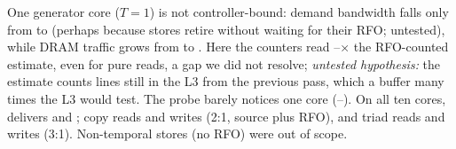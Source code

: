 One generator core ($T=1$) is not controller-bound: demand bandwidth falls only from
 to  (perhaps because
stores retire without waiting for their RFO; untested), while DRAM traffic grows from
 to . Here the counters
read --$\times$ the RFO-counted estimate, even for pure reads, a
gap we did not resolve; \emph{untested hypothesis:} the estimate counts lines still in the L3 from the
previous pass, which a buffer many times the L3 would test. The probe barely notices one core
(--). On all ten cores,  delivers
 and  ; copy reads
 and writes 
(2:1, source plus RFO), and triad reads  and writes
 (3:1). Non-temporal stores (no RFO) were out of scope.
